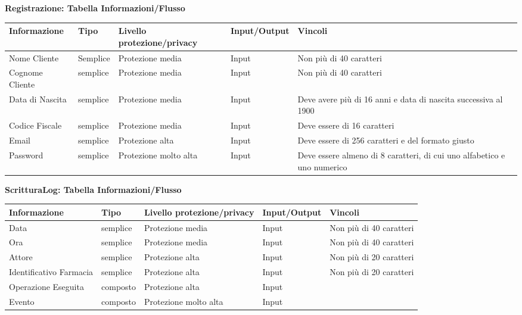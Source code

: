 \newpage
\textbf{Registrazione: Tabella Informazioni/Flusso}
\hfill \break

\begin{tabular} {|P{3cm}|P{3cm}|P{3cm}|P{3cm}|P{3cm}|}
    \hline
    \textbf{Informazione} & \textbf{Tipo} & \textbf{Livello protezione/privacy} & \textbf{Input/Output} & \textbf{Vincoli} \\
    \hline
    Nome Cliente & Semplice & Protezione media & Input & Non più di 40 caratteri \\
    \hline
    Cognome Cliente & semplice & Protezione media & Input & Non più di 40 caratteri \\
    \hline
    Data di Nascita & semplice & Protezione media & Input & Deve avere più di 16 anni e data di nascita successiva al 1900 \\
    \hline
    Codice Fiscale & semplice & Protezione media & Input & Deve essere di 16 caratteri \\
    \hline
    Email &  semplice & Protezione alta & Input & Deve essere di 256 caratteri e del formato giusto \\
    \hline
    Password & semplice & Protezione molto alta & Input & Deve essere almeno di 8 caratteri, di cui uno alfabetico e uno numerico \\
    \hline
\end{tabular}
\hfill \break
\hfill \break

\textbf{ScritturaLog: Tabella Informazioni/Flusso}
\hfill \break

\begin{tabular} {|P{3cm}|P{3cm}|P{3cm}|P{3cm}|P{3cm}|}
    \hline
    \textbf{Informazione} & \textbf{Tipo} & \textbf{Livello protezione/privacy} &  \textbf{Input/Output} & \textbf{Vincoli} \\
    \hline
    Data  & semplice & Protezione media & Input & Non più di 40 caratteri \\
    \hline
    Ora & semplice & Protezione media & Input & Non più di 40 caratteri \\
    \hline
    Attore & semplice & Protezione alta & Input & Non più di 20 caratteri \\
    \hline
    Identificativo Farmacia & semplice & Protezione alta & Input & Non più di 20 caratteri \\
    \hline
    Operazione Eseguita & composto & Protezione alta & Input & \\
    \hline
    Evento & composto & Protezione molto alta & Input &  \\
    \hline
\end{tabular}
\hfill \break
\hfill \break

